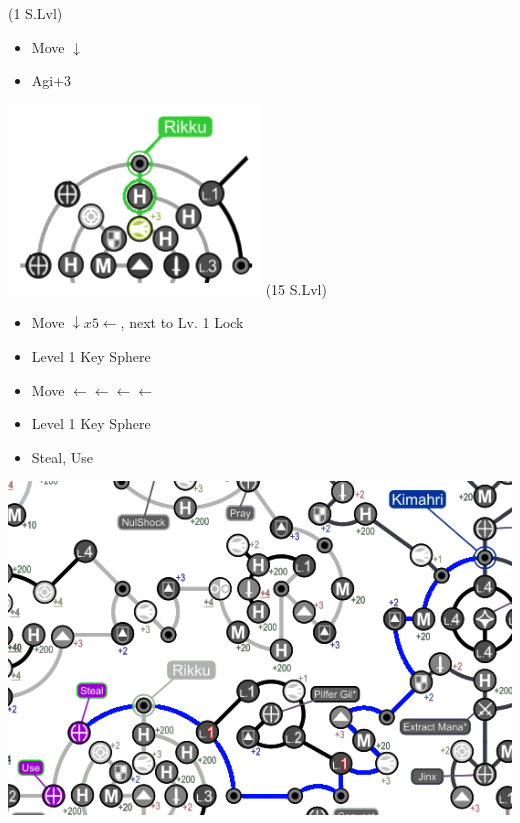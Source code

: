 \begin{spheregrid}
    \begin{multicols}{2}
        \begin{itemize}
            \rikkuf (1 S.Lvl)
            \begin{itemize}
                \item Move $\downarrow$
                \item Agi+3
            \end{itemize}
            \includegraphics[width=.5\columnwidth]{graphics/macalaniarikku}
            \kimahrif (15 S.Lvl)
            \begin{itemize}
                \item Move $\downarrow x5 \leftarrow$, next to Lv. 1 Lock
                \item Level 1 Key Sphere
                \item Move $\leftarrow\leftarrow\leftarrow\leftarrow$
                \item Level 1 Key Sphere
                \columnbreak
                \item Steal, Use
            \end{itemize}
            \includegraphics[width=.8\columnwidth]{graphics/Kimahri_post_spheremorph}
        \end{itemize}
    \end{multicols}
\end{spheregrid}
